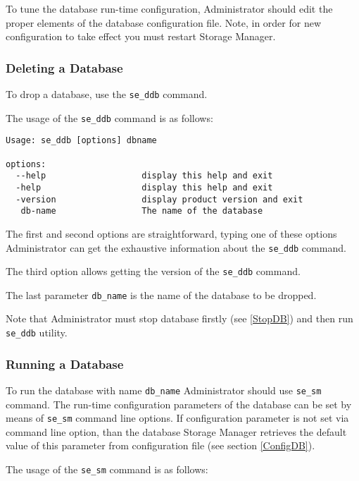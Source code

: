 \documentclass[a4paper,12pt]{article}
\begin{document}
To tune the database run-time configuration, Administrator should edit the proper elements of the database configuration file. Note, in order for new configuration to take effect you must restart Storage Manager.

\subsubsection{Deleting a Database}

To drop a database, use the \verb!se_ddb! command.

The usage of the \verb!se_ddb! command is as follows:

\begin{verbatim}
Usage: se_ddb [options] dbname

options:
  --help                   display this help and exit
  -help                    display this help and exit
  -version                 display product version and exit
   db-name                 The name of the database
\end{verbatim}

The first and second options are straightforward, typing one of these options Administrator can get the exhaustive information about the \verb!se_ddb! command.

The third option allows getting the version of the \verb!se_ddb! command.

The last parameter \verb!db_name! is the name of the database to be dropped.

Note that Administrator must stop database firstly (see \ref{StopDB}) and then run \verb!se_ddb! utility.

\subsubsection{Running a Database}
\label{RunDB}

To run the database with name \verb!db_name! Administrator should use \verb!se_sm! command. The run-time configuration parameters of the database can be set by means of \verb!se_sm! command line options. If configuration parameter is not set via command line option, than the database Storage Manager retrieves the default value of this parameter from configuration file (see section \ref{ConfigDB}).

The usage of the \verb!se_sm! command is as follows:
\end{document}
